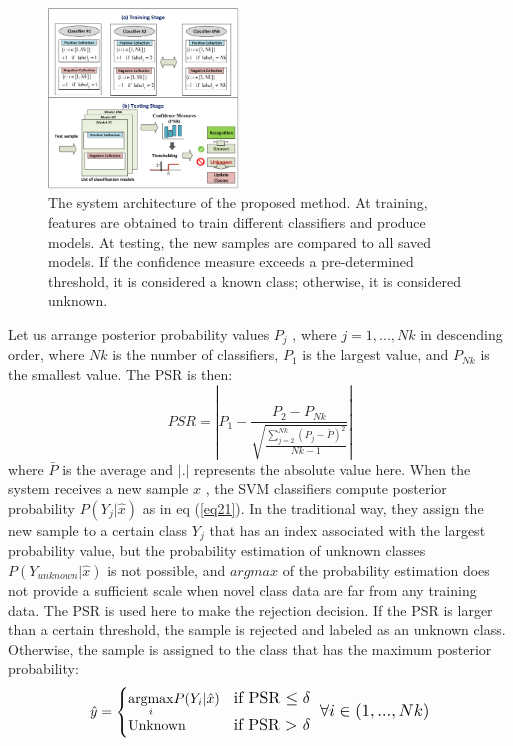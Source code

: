 \documentclass{ieeeaccess}
\begin{document}
\begin{figure}[t!]
	\centering
	\includegraphics[width=0.45\textwidth]{img/architecture.png}
	\caption{The system architecture of the proposed method. At training, features are obtained to train different classifiers and produce models. At testing, the new samples are compared to all saved models. If the confidence measure exceeds a pre-determined threshold, it is considered a known class; otherwise, it is considered unknown.}
	\label{fig:fig2}
\end{figure}
Let us arrange posterior probability values $ P_{j} $ , where  $ j=1,...,Nk $  in descending order, where $ Nk $  is the number of classifiers, $ P_{1} $   is the largest value, and $ P_{Nk} $  is the smallest value. The PSR is then:
\begin{equation}
PSR = \left| {{P_1} - \frac{{{P_2} - {P_{Nk}}}}{{\sqrt {\frac{{\sum\nolimits_{j = 2}^{Nk} {{{({P_j} - \bar P)}^2}} }}{{Nk - 1}}} }}} \right|
\label{eq22}
\end{equation}
where $ \bar P $  is the average and $ \left|.\right| $  represents the absolute value here. When the system receives a new sample $ \hat x $ , the SVM classifiers compute posterior probability 
$P({Y_j}|\hat x)$  as in eq (\ref{eq21}). In the traditional way, they assign the new sample to a certain class $ Y_{j} $  that has an index associated with the largest probability value, but the probability estimation of unknown classes $ P({Y_{unknown}}|\hat x)$   is not possible, and $argmax$ of the probability estimation does not provide a sufficient scale when novel class data are far from any training data. The PSR is used here to make the rejection decision. If the PSR is larger than a certain threshold, the sample is rejected and labeled as an unknown class. Otherwise, the sample is assigned to the class that has the maximum posterior probability:
\begin{equation}
\hat y = \begin{cases} 
\text{$\underset{i}{\mathrm{argmax}} P({Y_i}|\hat x)$}     &    
\resizebox{0.16\hsize}{!}{$\text{if PSR  $\leq \delta$}$}  \\
\text{Unknown}     &   
\resizebox{0.16\hsize}{!}{$\text{if PSR > $\delta$}$}  
\end{cases} 
\resizebox{0.24\hsize}{!}{$\text{  }\forall i \in (1,...,Nk)$}
\label{eq23}
\end{equation}
\end{document}
